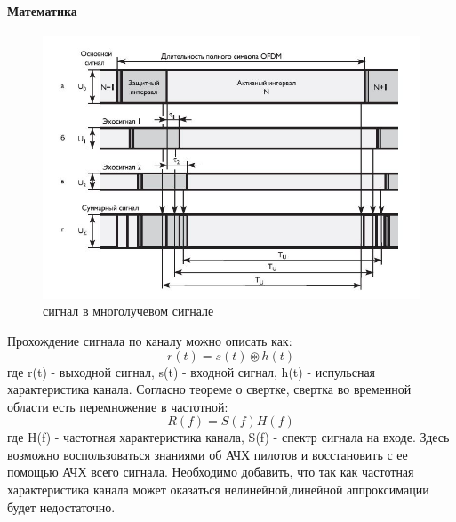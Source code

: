 \paragraph {Математика}

\begin{figure}[!h]
\includegraphics{manyRays}
\caption{сигнал в многолучевом сигнале}
\end{figure}

Прохождение сигнала по каналу можно описать как: $$r(t) = s(t)\circledast h(t)$$ где r(t) - выходной сигнал, s(t) - входной сигнал, h(t) - испульсная характеристика канала. Согласно теореме о свертке, свертка во временной области есть перемножение в частотной:  $$R(f) = S(f) H(f)$$ где H(f) - частотная характеристика канала, S(f) - спектр сигнала на входе. Здесь возможно воспользоваться знаниями об АЧХ пилотов и восстановить  с ее помощью АЧХ всего сигнала.
Необходимо добавить, что так как частотная характеристика канала может оказаться нелинейной,линейной аппроксимации будет недостаточно.

